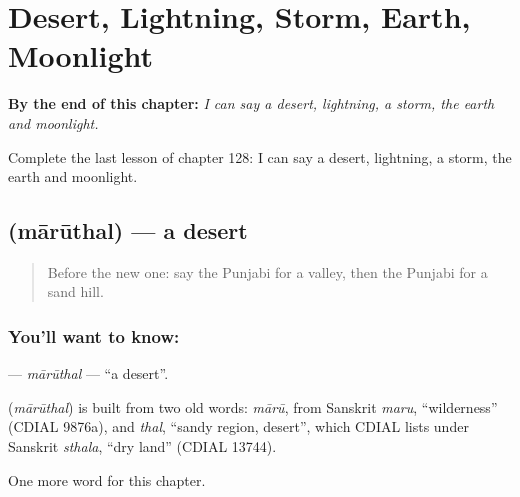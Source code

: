
\chapter{Desert, Lightning, Storm, Earth, Moonlight}
\label{ch:pa-desert-lightning-storm-earth-moonlight}

\begin{chapteropening}
\textbf{By the end of this chapter:} \emph{I can say a desert, lightning, a storm, the earth and moonlight.}

Complete the last lesson of chapter 128: I can say a desert, lightning, a storm, the earth and moonlight.
\end{chapteropening}

\section[\texorpdfstring{\pa{ਮਾਰੂਥਲ} (mārūthal)}{ਮਾਰੂਥਲ (mārūthal)}]{ (mārūthal) — a desert}

\label{lesson:PA-C128-maruthal}



\begin{quote}
Before the new one: say the Punjabi for a valley, then the Punjabi for a sand hill.
\end{quote}

\subsection*{You'll want to know: }
\textbf{} — \emph{mārūthal} — \textquotedblleft{}a desert\textquotedblright{}.

\begin{cousinweb}
\textbf{} (\emph{mārūthal}) is built from two old words: \emph{mārū}, from Sanskrit \emph{maru}, \textquotedblleft{}wilderness\textquotedblright{} (CDIAL 9876a), and \emph{thal}, \textquotedblleft{}sandy region, desert\textquotedblright{}, which CDIAL lists under Sanskrit \emph{sthala}, \textquotedblleft{}dry land\textquotedblright{} (CDIAL 13744).
\end{cousinweb}

\begin{grammarlens}[title={What you've built}]
One more word for this chapter.
\end{grammarlens}

